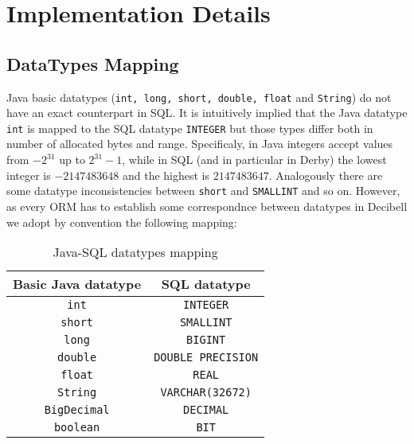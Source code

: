 \documentclass[a4paper,10pt]{article}
\begin{document}
\section*{Implementation Details}
\subsection*{DataTypes Mapping}
Java basic datatypes (\texttt{int, long, short, double, float} and \texttt{String}) do not have an
exact counterpart in SQL. It is intuitively implied that the Java datatype \texttt{int} is mapped to
the SQL datatype \texttt{INTEGER} but those types differ both in number of allocated bytes and 
range. Specificaly, in Java integers accept values from $-2^{31}$ up to ${2^{31}-1}$, while in SQL (and in 
particular in Derby) the lowest integer is $-2147483648$ and the highest is $2147483647$. Analogously there
are some datatype inconsistencies between \texttt{short} and \texttt{SMALLINT} and so on.
However, as every ORM has to establish some correspondnce between datatypes in Decibell we 
adopt by convention the following mapping:

\begin{table}[ht]
\caption{Java-SQL datatypes mapping}   
\centering           
\begin{tabular}{c c }
\hline\hline
Basic Java datatype & SQL datatype \hspace*{10} \\ [0.5ex]
\hline                         
\texttt{int} 	& 		\texttt{INTEGER}  \\             
\texttt{short} 	& 	\texttt{SMALLINT} \\ 
\texttt{long} 	& 	\texttt{BIGINT} \\
\texttt{double} & 	\texttt{DOUBLE PRECISION} \\
\texttt{float} 	& 	\texttt{REAL} \\
\texttt{String} & 	\texttt{VARCHAR(32672)} \\
\texttt{BigDecimal} 	& 	\texttt{DECIMAL}\\
\texttt{boolean} 	& 	\texttt{BIT}\\ [1ex]         
\hline
\end{tabular}
\end{table}
\end{document}
